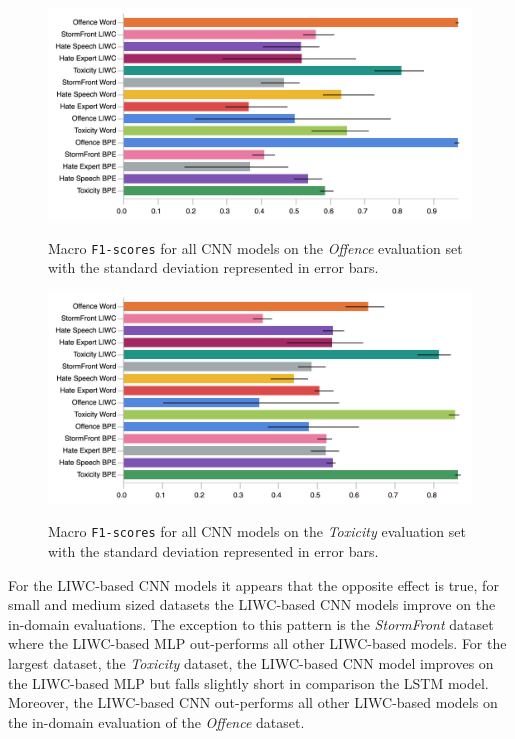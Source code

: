 \begin{figure}
\begin{minipage}{\textwidth}
\centering
    \includegraphics[width=\textwidth]{all_cnn_davidson_test.pdf}
    \caption{Macro \texttt{F1-scores} for all CNN models on the \textit{Offence} evaluation set with the standard deviation represented in error bars.}
    \label{fig:davidson_cnn_test}
    \vfill
    \includegraphics[width=\textwidth]{all_cnn_wulczyn_test.pdf}
    \caption{Macro \texttt{F1-scores} for all CNN models on the \textit{Toxicity} evaluation set with the standard deviation represented in error bars.}
    \label{fig:wulczyn_cnn_test}
  \end{minipage}
\end{figure}

For the LIWC-based CNN models it appears that the opposite effect is true, for small and medium sized datasets the LIWC-based CNN models improve on the in-domain evaluations.
The exception to this pattern is the \textit{StormFront} dataset where the LIWC-based MLP out-performs all other LIWC-based models.
For the largest dataset, the \textit{Toxicity} dataset, the LIWC-based CNN model improves on the LIWC-based MLP but falls slightly short in comparison the LSTM model.
Moreover, the LIWC-based CNN out-performs all other LIWC-based models on the in-domain evaluation of the \textit{Offence} dataset.


